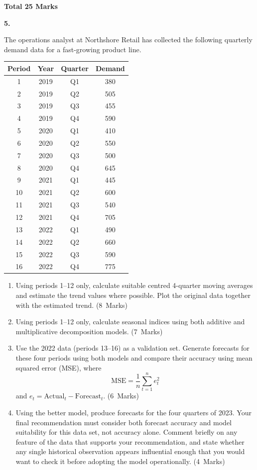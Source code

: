 \documentclass[11pt,a4paper]{article}
\newcommand{\markalloc}[1]{\nobreak\hfill\mbox{(#1 Marks)}}
\newcommand{\questiontotal}[1]{\begin{flushright}\textbf{Total #1 Marks}\end{flushright}}
\begin{document}
\questiontotal{25}

\newpage

\textbf{5.}

The operations analyst at Northshore Retail has collected the following quarterly demand data for a fast-growing product line.

\begin{center}
\begin{tabular}{cccc}
\toprule
Period & Year & Quarter & Demand \\
\midrule
1  & 2019 & Q1 & 380 \\
2  & 2019 & Q2 & 505 \\
3  & 2019 & Q3 & 455 \\
4  & 2019 & Q4 & 590 \\
5  & 2020 & Q1 & 410 \\
6  & 2020 & Q2 & 550 \\
7  & 2020 & Q3 & 500 \\
8  & 2020 & Q4 & 645 \\
9  & 2021 & Q1 & 445 \\
10 & 2021 & Q2 & 600 \\
11 & 2021 & Q3 & 540 \\
12 & 2021 & Q4 & 705 \\
13 & 2022 & Q1 & 490 \\
14 & 2022 & Q2 & 660 \\
15 & 2022 & Q3 & 590 \\
16 & 2022 & Q4 & 775 \\
\bottomrule
\end{tabular}
\end{center}

\begin{enumerate}
\item Using periods 1--12 only, calculate suitable centred 4-quarter moving averages and estimate the trend values where possible.
Plot the original data together with the estimated trend. \markalloc{8}

\item Using periods 1--12 only, calculate seasonal indices using both additive and multiplicative decomposition models. \markalloc{7}

\item Use the 2022 data (periods 13--16) as a validation set.
Generate forecasts for these four periods using both models and compare their accuracy using mean squared error (MSE), where
\[
\mathrm{MSE} = \frac{1}{n}\sum_{t=1}^{n} e_t^2
\]
and $e_t = \text{Actual}_t - \text{Forecast}_t$. \markalloc{6}

\item Using the better model, produce forecasts for the four quarters of 2023.
Your final recommendation must consider both forecast accuracy and model suitability for this data set, not accuracy alone.
Comment briefly on any feature of the data that supports your recommendation, and state whether any single historical observation appears influential enough that you would want to check it before adopting the model operationally. \markalloc{4}
\end{enumerate}
\end{document}
